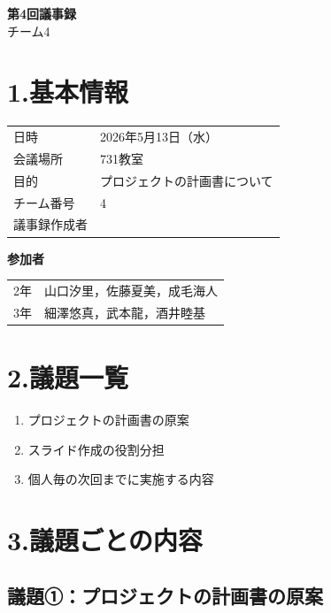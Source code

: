 \documentclass[a4paper,12pt]{ltjsarticle}
\begin{document}
\begin{center}
  {\Large \textbf{第4回議事録}}\\[8pt]
  {\large チーム4}
\end{center}

\vspace{4mm}

\section*{1.基本情報}
\begin{tabular}{ll}
  \toprule
  日時     & 2026年5月13日（水） \\
  会議場所 & 731教室 \\
  目的     & プロジェクトの計画書について \\
  チーム番号 & 4 \\
  議事録作成者 &  \\
  \bottomrule
\end{tabular}

\vspace{4mm}
\noindent\textbf{参加者}

\begin{tabular}{ll}
  2年 & 山口汐里，佐藤夏美，成毛海人 \\
  3年 & 細澤悠真，武本龍，酒井睦基 \\
\end{tabular}

\section*{2.議題一覧}
\begin{enumerate}[label=議題\arabic*：]
  \item プロジェクトの計画書の原案
  \item スライド作成の役割分担
  \item 個人毎の次回までに実施する内容
\end{enumerate}

\section*{3.議題ごとの内容}

\subsection*{議題①：プロジェクトの計画書の原案}
\end{document}
